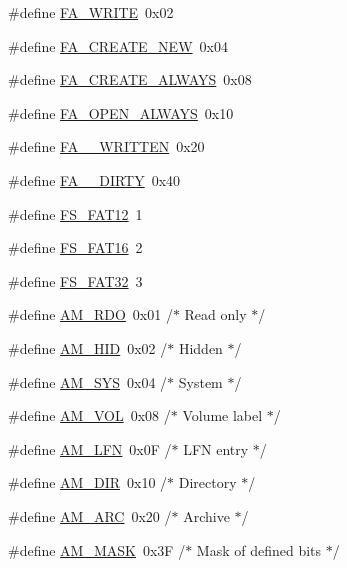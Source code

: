 \begin{DoxyCompactItemize}
\#define \hyperlink{ff_8h_afa366963220c89b882c0361794020c14}{F\+A\+\_\+\+W\+R\+I\+T\+E}~0x02
\item 
\#define \hyperlink{ff_8h_a417bb1babd1785fd181a806b5613eba3}{F\+A\+\_\+\+C\+R\+E\+A\+T\+E\+\_\+\+N\+E\+W}~0x04
\item 
\#define \hyperlink{ff_8h_afba4546b131dea4b24727fa20a80e29f}{F\+A\+\_\+\+C\+R\+E\+A\+T\+E\+\_\+\+A\+L\+W\+A\+Y\+S}~0x08
\item 
\#define \hyperlink{ff_8h_a17b01553029920ac0468912b4bcb16c7}{F\+A\+\_\+\+O\+P\+E\+N\+\_\+\+A\+L\+W\+A\+Y\+S}~0x10
\item 
\#define \hyperlink{ff_8h_ac4b7d5223f84df91c306ffbff536fae4}{F\+A\+\_\+\+\_\+\+W\+R\+I\+T\+T\+E\+N}~0x20
\item 
\#define \hyperlink{ff_8h_a5b2962e3616a1e9eb709d95f4c75c67c}{F\+A\+\_\+\+\_\+\+D\+I\+R\+T\+Y}~0x40
\item 
\#define \hyperlink{ff_8h_aab755aa1b4f81f4aabee4a5d4738cfb0}{F\+S\+\_\+\+F\+A\+T12}~1
\item 
\#define \hyperlink{ff_8h_a7ef90a36d99edfc0138a2155a17a79b9}{F\+S\+\_\+\+F\+A\+T16}~2
\item 
\#define \hyperlink{ff_8h_ac63e0796095a789cefdbc3c3c676c9ce}{F\+S\+\_\+\+F\+A\+T32}~3
\item 
\#define \hyperlink{ff_8h_add6d85d1e7a02b4f6188783ef91a5f1e}{A\+M\+\_\+\+R\+D\+O}~0x01	/$\ast$ Read only $\ast$/
\item 
\#define \hyperlink{ff_8h_aa90c4c921c1955fd407d8bbf17f1674e}{A\+M\+\_\+\+H\+I\+D}~0x02	/$\ast$ Hidden $\ast$/
\item 
\#define \hyperlink{ff_8h_a1f25d5c17b5a3a6397b3398add8cdc15}{A\+M\+\_\+\+S\+Y\+S}~0x04	/$\ast$ System $\ast$/
\item 
\#define \hyperlink{ff_8h_a5cfae62dabae0a54809e43b36685ce7c}{A\+M\+\_\+\+V\+O\+L}~0x08	/$\ast$ Volume label $\ast$/
\item 
\#define \hyperlink{ff_8h_a91161ef62e0e85ba3c2876d3d339473d}{A\+M\+\_\+\+L\+F\+N}~0x0\+F	/$\ast$ L\+F\+N entry $\ast$/
\item 
\#define \hyperlink{ff_8h_a3a9db44e978ed6c13b641e092d4cd7d3}{A\+M\+\_\+\+D\+I\+R}~0x10	/$\ast$ Directory $\ast$/
\item 
\#define \hyperlink{ff_8h_ae8174d00798e34e7c9e95898cb9e1a09}{A\+M\+\_\+\+A\+R\+C}~0x20	/$\ast$ Archive $\ast$/
\item 
\#define \hyperlink{ff_8h_aefa78fd6b130faaca4e115602869b57c}{A\+M\+\_\+\+M\+A\+S\+K}~0x3\+F	/$\ast$ Mask of defined bits $\ast$/
\item 

\end{DoxyCompactItemize}
